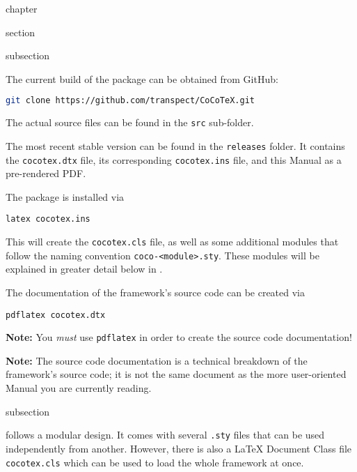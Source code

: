 \begin{heading}{chapter}
\end{heading}

\begin{heading}{section}
\end{heading}

\begin{heading}{subsection}
\end{heading}

The current build of the package can be obtained from GitHub:
\begin{lstlisting}[style=tex,language=bash]
git clone https://github.com/transpect/CoCoTeX.git
\end{lstlisting}
The actual source files can be found in the \lstinline{src} sub-folder.

The most recent stable version can be found in the
\lstinline{releases} folder. It contains the \lstinline{cocotex.dtx}
file, its corresponding \lstinline{cocotex.ins} file, and this
Manual as a pre-rendered PDF.

The package is installed via
\begin{lstlisting}[style=tex]
latex cocotex.ins
\end{lstlisting}
This will create the \lstinline{cocotex.cls} file, as well as some
additional modules that follow the naming convention
\lstinline{coco-<module>.sty}. These modules will be explained in
greater detail below in .

The documentation of the framework's source code can be created via
\begin{lstlisting}[style=tex]
pdflatex cocotex.dtx
\end{lstlisting}
\textbf{Note:} You \textit{must} use \lstinline{pdflatex} in order to
create the source code documentation!

\textbf{Note:} The source code documentation is a technical breakdown
of the framework's source code; it is not the same document as the
more user-oriented Manual you are currently reading.

\begin{heading}{subsection}
\end{heading}

{\CoCoTeX} follows a modular design. It comes with several
\lstinline{.sty} files that can be used independently from
another. However, there is also a {\LaTeX} Document Class file
\lstinline{cocotex.cls} which can be used to load the whole framework
at once.

